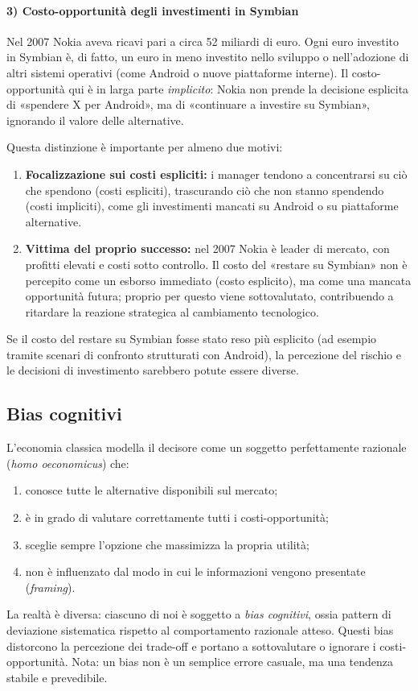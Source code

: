 \documentclass[a4paper,12pt]{article}
\begin{document}
	\paragraph{3) Costo-opportunità degli investimenti in Symbian}
	
	Nel 2007 Nokia aveva ricavi pari a circa 52 miliardi di euro.%
	Ogni euro investito in Symbian è, di fatto, un euro in meno investito nello sviluppo o nell'adozione di altri sistemi operativi (come Android o nuove piattaforme interne).%
	Il costo-opportunità qui è in larga parte \emph{implicito}: Nokia non prende la decisione esplicita di «spendere X per Android», ma di «continuare a investire su Symbian», ignorando il valore delle alternative.
	
	Questa distinzione è importante per almeno due motivi:
	\begin{enumerate}
		\item \textbf{Focalizzazione sui costi espliciti:} i manager tendono a concentrarsi su ciò che spendono (costi espliciti), trascurando ciò che non stanno spendendo (costi impliciti), come gli investimenti mancati su Android o su piattaforme alternative.
		\item \textbf{Vittima del proprio successo:} nel 2007 Nokia è leader di mercato, con profitti elevati e costi sotto controllo. Il costo del «restare su Symbian» non è percepito come un esborso immediato (costo esplicito), ma come una mancata opportunità futura; proprio per questo viene sottovalutato, contribuendo a ritardare la reazione strategica al cambiamento tecnologico.
	\end{enumerate}
	Se il costo del restare su Symbian fosse stato reso più esplicito (ad esempio tramite scenari di confronto strutturati con Android), la percezione del rischio e le decisioni di investimento sarebbero potute essere diverse.
	
	
	\subsection{Bias cognitivi}
	
	L'economia classica modella il decisore come un soggetto perfettamente razionale (\emph{homo oeconomicus}) che:%
	\begin{enumerate}
		\item conosce tutte le alternative disponibili sul mercato;
		\item è in grado di valutare correttamente tutti i costi-opportunità;%
		\item sceglie sempre l'opzione che massimizza la propria utilità;
		\item non è influenzato dal modo in cui le informazioni vengono presentate (\emph{framing}).%
	\end{enumerate}
	La realtà è diversa: ciascuno di noi è soggetto a \emph{bias cognitivi}, ossia pattern di deviazione sistematica rispetto al comportamento razionale atteso.%
	Questi bias distorcono la percezione dei trade-off e portano a sottovalutare o ignorare i costi-opportunità.%
	Nota: un bias non è un semplice errore casuale, ma una tendenza stabile e prevedibile.
	
\end{document}
